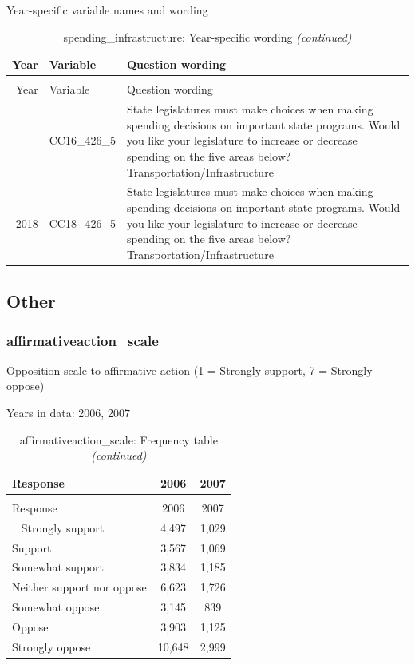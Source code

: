 \documentclass[12pt]{article}
\begin{document}
\endgroup{}

Year-specific variable names and wording

\begin{longtable}[t]{rl>{\raggedright\arraybackslash}p{10cm}}
\caption{\label{tab:unnamed-chunk-4}spending\_infrastructure: Year-specific wording}\\
\toprule
Year & Variable & Question wording\\
\midrule
\endfirsthead
\caption[]{spending\_infrastructure: Year-specific wording \textit{(continued)}}\\
\toprule
Year & Variable & Question wording\\
\midrule
\endhead
\
\endfoot
\bottomrule
\endlastfoot
2016 & CC16\_426\_5 & State legislatures must make choices when making spending decisions on important state programs. Would you like your legislature to increase or decrease spending on the five areas below? Transportation/Infrastructure\\
2018 & CC18\_426\_5 & State legislatures must make choices when making spending decisions on important state programs. Would you like your legislature to increase or decrease spending on the five areas below? Transportation/Infrastructure\\*
\end{longtable}\newpage

\subsection{Other}\label{other}

\subsubsection{affirmativeaction\_scale}\label{affirmativeaction_scale}

Opposition scale to affirmative action (1 = Strongly support, 7 =
Strongly oppose)

Years in data: 2006, 2007\begingroup\fontsize{10}{12}\selectfont

\begin{longtable}[t]{lcc}
\caption{\label{tab:unnamed-chunk-4}affirmativeaction\_scale: Frequency table}\\
\toprule
Response & 2006 & 2007\\
\midrule
\endfirsthead
\caption[]{affirmativeaction\_scale: Frequency table \textit{(continued)}}\\
\toprule
Response & 2006 & 2007\\
\midrule
\endhead
\
\endfoot
\bottomrule
\endlastfoot
Strongly support & 4,497 & 1,029\\
Support & 3,567 & 1,069\\
Somewhat support & 3,834 & 1,185\\
Neither support nor oppose & 6,623 & 1,726\\
Somewhat oppose & 3,145 & 839\\
Oppose & 3,903 & 1,125\\
Strongly oppose & 10,648 & 2,999\\*
\end{longtable}
\end{document}
